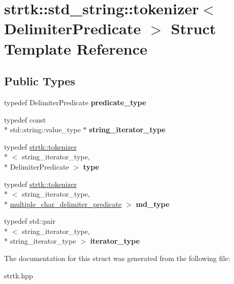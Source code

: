 \hypertarget{structstrtk_1_1std__string_1_1tokenizer}{\section{strtk\-:\-:std\-\_\-string\-:\-:tokenizer$<$ Delimiter\-Predicate $>$ Struct Template Reference}
\label{structstrtk_1_1std__string_1_1tokenizer}
}
\subsection*{Public Types}
\begin{DoxyCompactItemize}
\item 
\hypertarget{structstrtk_1_1std__string_1_1tokenizer_ab08a9828fa8cba7df45027ecb8ad15c0}{typedef Delimiter\-Predicate {\bfseries predicate\-\_\-type}}\label{structstrtk_1_1std__string_1_1tokenizer_ab08a9828fa8cba7df45027ecb8ad15c0}

\item 
\hypertarget{structstrtk_1_1std__string_1_1tokenizer_ae3e3e5f2a9ecf17cebe11d17431106bf}{typedef const \\*
std\-::string\-::value\-\_\-type $\ast$ {\bfseries string\-\_\-iterator\-\_\-type}}\label{structstrtk_1_1std__string_1_1tokenizer_ae3e3e5f2a9ecf17cebe11d17431106bf}

\item 
\hypertarget{structstrtk_1_1std__string_1_1tokenizer_a7c34279fd32e86b8bab24c3b0c45911e}{typedef \hyperlink{classstrtk_1_1tokenizer}{strtk\-::tokenizer}\\*
$<$ string\-\_\-iterator\-\_\-type, \\*
Delimiter\-Predicate $>$ {\bfseries type}}\label{structstrtk_1_1std__string_1_1tokenizer_a7c34279fd32e86b8bab24c3b0c45911e}

\item 
\hypertarget{structstrtk_1_1std__string_1_1tokenizer_af3aac58cd037ee2950a71c6ce7035c76}{typedef \hyperlink{classstrtk_1_1tokenizer}{strtk\-::tokenizer}\\*
$<$ string\-\_\-iterator\-\_\-type, \\*
\hyperlink{structstrtk_1_1multiple__char__delimiter__predicate}{multiple\-\_\-char\-\_\-delimiter\-\_\-predicate} $>$ {\bfseries md\-\_\-type}}\label{structstrtk_1_1std__string_1_1tokenizer_af3aac58cd037ee2950a71c6ce7035c76}

\item 
\hypertarget{structstrtk_1_1std__string_1_1tokenizer_aee0ddd67a437471b650a89dd5f031897}{typedef std\-::pair\\*
$<$ string\-\_\-iterator\-\_\-type, \\*
string\-\_\-iterator\-\_\-type $>$ {\bfseries iterator\-\_\-type}}\label{structstrtk_1_1std__string_1_1tokenizer_aee0ddd67a437471b650a89dd5f031897}

\end{DoxyCompactItemize}


The documentation for this struct was generated from the following file\-:\begin{DoxyCompactItemize}
\item 
strtk.\-hpp\end{DoxyCompactItemize}
